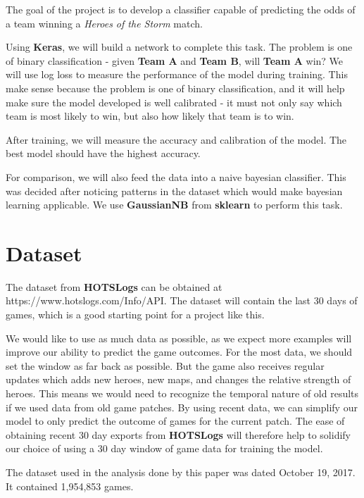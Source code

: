 \documentclass[twoside,twocolumn]{article}
\begin{document}
The goal of the project is to develop a classifier capable of predicting the odds of a team winning a \textit{Heroes of the Storm} match.

Using \textbf{Keras}, we will build a network to complete this task.  The problem is one of binary classification - given \textbf{Team A} and \textbf{Team B}, will \textbf{Team A} win?  We will use log loss to measure the performance of the model during training.  This make sense because the problem is one of binary classification, and it will help make sure the model developed is well calibrated - it must not only say which team is most likely to win, but also how likely that team is to win.

After training, we will measure the accuracy and calibration of the model.  The best model should have the highest accuracy.

For comparison, we will also feed the data into a naive bayesian classifier. This was decided after noticing patterns in the dataset which would make bayesian learning applicable.  We use \textbf{GaussianNB} from \textbf{sklearn} to perform this task.


\section{Dataset}

The dataset from \textbf{HOTSLogs} can be obtained at https://www.hotslogs.com/Info/API.  The dataset will contain the last 30 days of games, which is a good starting point for a project like this.  

We would like to use as much data as possible, as we expect more examples will improve our ability to predict the game outcomes.  For the most data, we should set the window as far back as possible.  But the game also receives regular updates which adds new heroes, new maps, and changes the relative strength of heroes.  This means we would need to recognize the temporal nature of old results if we used data from old game patches.  By using recent data, we can simplify our model to only predict the outcome of games for the current patch.  The ease of obtaining recent 30 day exports from \textbf{HOTSLogs} will therefore help to solidify our choice of using a 30 day window of game data for training the model.

The dataset used in the analysis done by this paper was dated October 19, 2017.  It contained 1,954,853 games.
\end{document}
